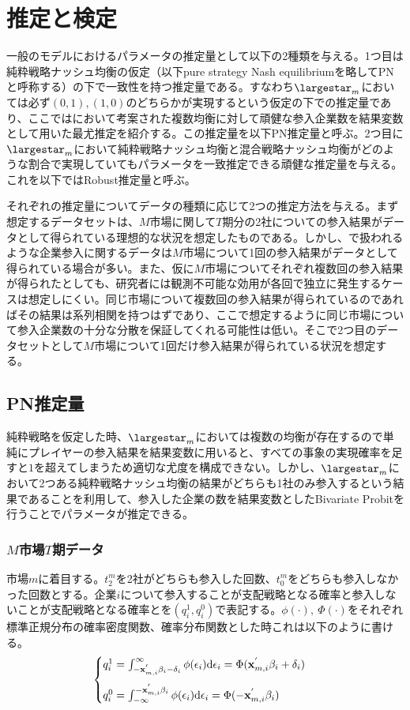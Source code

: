 
\chapter{推定と検定}
一般のモデルにおけるパラメータの推定量として以下の2種類を与える。1つ目は純粋戦略ナッシュ均衡の仮定（以下pure strategy Nash equilibriumを略してPNと呼称する）の下で一致性を持つ推定量である。すなわち$\largestar_m$においては必ず$(0,1), (1,0)$のどちらかが実現するという仮定の下での推定量であり、ここでは\cite{Bresnahan1991}において考案された複数均衡に対して頑健な参入企業数を結果変数として用いた最尤推定を紹介する。この推定量を以下PN推定量と呼ぶ。2つ目に$\largestar_m$において純粋戦略ナッシュ均衡と混合戦略ナッシュ均衡がどのような割合で実現していてもパラメータを一致推定できる頑健な推定量を与える。これを以下ではRobust推定量と呼ぶ。

それぞれの推定量についてデータの種類に応じて2つの推定方法を与える。まず想定するデータセットは、$M$市場に関して$T$期分の2社についての参入結果がデータとして得られている理想的な状況を想定したものである。しかし、\cite{Ciliberto2009a}で扱われるような企業参入に関するデータは$M$市場について1回の参入結果がデータとして得られている場合が多い。また、仮に$M$市場についてそれぞれ複数回の参入結果が得られたとしても、研究者には観測不可能な効用が各回で独立に発生するケースは想定しにくい。同じ市場について複数回の参入結果が得られているのであればその結果は系列相関を持つはずであり、ここで想定するように同じ市場について参入企業数の十分な分散を保証してくれる可能性は低い。そこで2つ目のデータセットとして$M$市場について1回だけ参入結果が得られている状況を想定する。

\section{PN推定量}
純粋戦略を仮定した時、$\largestar_m$においては複数の均衡が存在するので単純にプレイヤーの参入結果を結果変数に用いると、すべての事象の実現確率を足すと$1$を超えてしまうため適切な尤度を構成できない。しかし、$\largestar_m$において2つある純粋戦略ナッシュ均衡の結果がどちらも1社のみ参入するという結果であることを利用して、参入した企業の数を結果変数としたBivariate Probitを行うことでパラメータが推定できる。

\subsection{$M$市場$T$期データ}
市場$m$に着目する。$t_2^m$を2社がどちらも参入した回数、$t_0^m$をどちらも参入しなかった回数とする。企業$i$について参入することが支配戦略となる確率と参入しないことが支配戦略となる確率とを$(q_i^1, q_i^0)$で表記する。$\phi(\cdot),\ \Phi(\cdot)$をそれぞれ標準正規分布の確率密度関数、確率分布関数とした時これは以下のように書ける。
\begin{align*}
\begin{cases}
	q_i^1 = \int_{-{\bf x}_{m, i}^{'} \beta_i - \delta_i}^{\infty} \phi(\epsilon_i) \mathrm{d}\epsilon_i = \Phi({\bf x}_{m, i}^{'} \beta_i + \delta_i)\\[10pt]
	q_i^0 = \int_{-\infty}^{-{\bf x}_{m, i}^{'} \beta_i} \phi(\epsilon_i) \mathrm{d}\epsilon_i = \Phi(-{\bf x}_{m, i}^{'} \beta_i)
\end{cases}
\end{align*}

